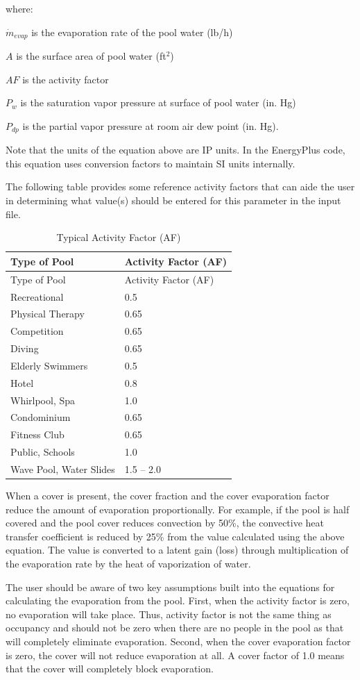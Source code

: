 where:

\(\dot{m}_{evap}\) is the evaporation rate of the pool water (lb/h)

\(A\) is the surface area of pool water (ft\(^2\))

\(AF\) is the activity factor

\(P_w\) is the saturation vapor pressure at surface of pool water (in. Hg)

\(P_{dp}\) is the partial vapor pressure at room air dew point (in. Hg).

Note that the units of the equation above are IP units.  In the EnergyPlus code, this equation uses conversion factors to maintain SI units internally.

The following table provides some reference activity factors that can aide the user in determining what value(s) should be entered for this parameter in the input file.

\begin{longtable}[c]{@{}ll@{}}
\caption{Typical Activity Factor (AF) \label{table:typical-activity-factor-af}} \tabularnewline
\toprule
Type of Pool & Activity Factor (AF) \tabularnewline
\midrule
\endfirsthead

\toprule
Type of Pool & Activity Factor (AF) \tabularnewline
\midrule
\endhead

Recreational & 0.5 \tabularnewline
Physical Therapy & 0.65 \tabularnewline
Competition & 0.65 \tabularnewline
Diving & 0.65 \tabularnewline
Elderly Swimmers & 0.5 \tabularnewline
Hotel & 0.8 \tabularnewline
Whirlpool, Spa & 1.0 \tabularnewline
Condominium & 0.65 \tabularnewline
Fitness Club & 0.65 \tabularnewline
Public, Schools & 1.0 \tabularnewline
Wave Pool, Water Slides & 1.5 – 2.0 \tabularnewline
\bottomrule
\end{longtable}

When a cover is present, the cover fraction and the cover evaporation factor reduce the amount of evaporation proportionally. For example, if the pool is half covered and the pool cover reduces convection by 50\%, the convective heat transfer coefficient is reduced by 25\% from the value calculated using the above equation. The value is converted to a latent gain (loss) through multiplication of the evaporation rate by the heat of vaporization of water.

The user should be aware of two key assumptions built into the equations for calculating the evaporation from the pool.  First, when the activity factor is zero, no evaporation will take place.  Thus, activity factor is not the same thing as occupancy and should not be zero when there are no people in the pool as that will completely eliminate evaporation.  Second, when the cover evaporation factor is zero, the cover will not reduce evaporation at all.  A cover factor of 1.0 means that the cover will completely block evaporation.

